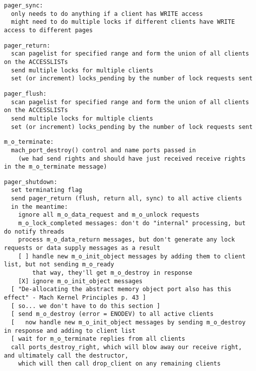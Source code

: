 \documentclass{article}
\begin{document}
\begin{verbatim}
pager_sync:
  only needs to do anything if a client has WRITE access
  might need to do multiple locks if different clients have WRITE access to different pages
\end{verbatim}

\begin{verbatim}
pager_return:
  scan pagelist for specified range and form the union of all clients on the ACCESSLISTs
  send multiple locks for multiple clients
  set (or increment) locks_pending by the number of lock requests sent
\end{verbatim}

\begin{verbatim}
pager_flush:
  scan pagelist for specified range and form the union of all clients on the ACCESSLISTs
  send multiple locks for multiple clients
  set (or increment) locks_pending by the number of lock requests sent
\end{verbatim}

\begin{verbatim}
m_o_terminate:
  mach_port_destroy() control and name ports passed in
    (we had send rights and should have just received receive rights in the m_o_terminate message)
\end{verbatim}

\begin{verbatim}
pager_shutdown:
  set terminating flag
  send pager_return (flush, return all, sync) to all active clients
  in the meantime:
    ignore all m_o_data_request and m_o_unlock requests
    m_o_lock_completed messages: don't do "internal" processing, but do notify threads
    process m_o_data_return messages, but don't generate any lock requests or data supply messages as a result
    [ ] handle new m_o_init_object messages by adding them to client list, but not sending m_o_ready
        that way, they'll get m_o_destroy in response
    [X] ignore m_o_init_object messages
  [ "De-allocating the abstract memory object port also has this effect" - Mach Kernel Principles p. 43 ]
  [ so... we don't have to do this section ]
  [ send m_o_destroy (error = ENODEV) to all active clients
  [   now handle new m_o_init_object messages by sending m_o_destroy in response and adding to client list
  [ wait for m_o_terminate replies from all clients
  call ports_destroy_right, which will blow away our receive right, and ultimately call the destructor,
    which will then call drop_client on any remaining clients
\end{verbatim}
\end{document}

